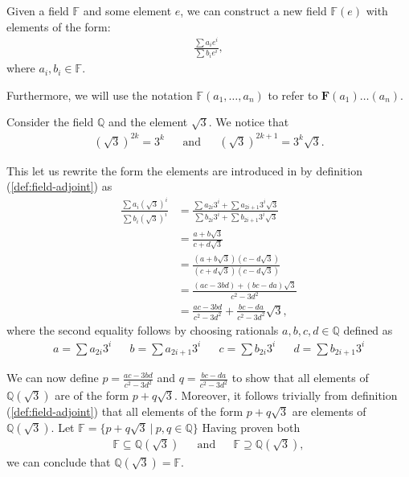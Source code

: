 \begin{defn} \label{def:field-adjoint}
  Given a field $\mathbb{F}$ and some element $e$, we can construct a new field $\mathbb{F}(e)$ with elements of the form:
\begin{align*}
  \frac{\sum a _i e ^i }{\sum b _i e ^i },
\end{align*}
where $a _i, b _i \in \mathbb{F}$.

  Furthermore, we will use the notation $\mathbb{F}(a _1 ,\ldots, a _n)$ to refer to $\textbf{F}(a _1) \ldots (a _n)$.
\end{defn}

\newpage
\begin{exmp} \label{exp:q-adjoint-sqrt-3}
  Consider the field $\mathbb Q$  and the element $\sqrt 3$. We notice that 
  \begin{align*}
    {(\sqrt 3)} ^{2k} = 3 ^k && \text{and} && {(\sqrt 3)} ^{2k + 1} = 3 ^k \sqrt 3.
  \end{align*}

  This let us rewrite the form the elements are introduced in by definition (\ref{def:field-adjoint}) as
  \begin{align*}
    \frac{\sum a _i {(\sqrt 3)} ^i }{\sum b _i {(\sqrt 3)} ^i }
    &= \frac{\sum a _{2i} 3 ^i + \sum a_{2i + 1} 3 ^i \sqrt 3}{\sum b _{2i} 3 ^i + \sum b_{2i + 1} 3 ^i \sqrt 3} 
    \\&= \frac{a + b\sqrt 3}{c + d\sqrt 3}
    \\&= \frac{(a + b \sqrt 3)(c - d \sqrt 3)}{(c + d \sqrt 3)(c - d \sqrt 3)}
    \\&= \frac{(ac - 3bd) + (bc - da) \sqrt 3}{c ^2 - 3 d ^2 }
    \\&= \frac{ac - 3bd}{c ^2 - 3 d ^2 } + \frac{bc - da}{c ^2 - 3 d ^2 } \sqrt 3,
  \end{align*}
  where the second equality follows by choosing rationals $a, b, c, d \in \mathbb{Q}$ defined as
  \begin{align*}
    a = \sum a _{2i} 3 ^i && b = \sum a _{2i + 1} 3 ^i  &&
    c = \sum b _{2i} 3 ^i && d = \sum b _{2i + 1} 3 ^i 
  \end{align*}

  We can now define $p = \frac{ac - 3bd}{c ^2 - 3 d ^2 }$ and $q = \frac{bc - da}{c ^2 - 3 d ^2 }$ to show that all elements of $ \mathbb{Q} (\sqrt{3})$ are of the form $p + q \sqrt 3$. Moreover, it follows trivially from  definition (\ref{def:field-adjoint}) that all elements of the form $p + q \sqrt 3$ are elements of $\mathbb{Q} (\sqrt{3})$. Let $\mathbb{F} = \{p + q \sqrt 3 \:|\: p, q \in \mathbb{Q} \}$ Having proven both 
  \begin{align*}
     \mathbb{F} \subseteq \mathbb{Q} (\sqrt 3) && \text{and} && \mathbb{F} \supseteq \mathbb{Q} (\sqrt 3),
  \end{align*}
 we can conclude that $\mathbb{Q} (\sqrt{3})  = \mathbb{F}$.


\end{exmp}
